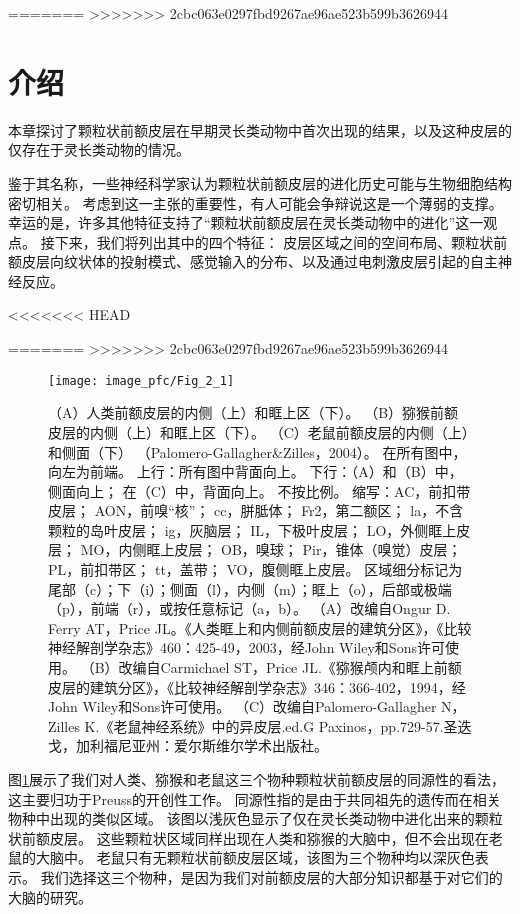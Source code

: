 =======
>>>>>>> 2cbc063e0297fbd9267ae96ae523b599b3626944
\section{介绍}

本章探讨了颗粒状前额皮层在早期灵长类动物中首次出现的结果，以及这种皮层的仅存在于灵长类动物的情况\cite{preuss2007evolutionary}。

鉴于其名称，一些神经科学家认为颗粒状前额皮层的进化历史可能与生物细胞结构密切相关。
考虑到这一主张的重要性，有人可能会争辩说这是一个薄弱的支撑。
幸运的是，许多其他特征支持了“颗粒状前额皮层在灵长类动物中的进化”这一观点。
接下来，我们将列出其中的四个特征：
皮层区域之间的空间布局、颗粒状前额皮层向纹状体的投射模式、感觉输入的分布、以及通过电刺激皮层引起的自主神经反应。




<<<<<<< HEAD


=======
>>>>>>> 2cbc063e0297fbd9267ae96ae523b599b3626944
\begin{figure}[!htb]
	\centering
	\texttt{[image: image\_pfc/Fig\_2\_1]}
	\caption{（A）人类前额皮层的内侧（上）和眶上区（下）\cite{ongur2003architectonic}。 
		（B）猕猴前额皮层的内侧（上）和眶上区（下）\cite{carmichael1994architectonic}。 
		（C）老鼠前额皮层的内侧（上）和侧面（下）
		（Palomero-Gallagher\&Zilles，2004）。
		在所有图中，向左为前端。
		上行：所有图中背面向上。
		下行：（A）和（B）中，侧面向上；
		在（C）中，背面向上。
		不按比例。
		缩写：AC，前扣带皮层；
		AON，前嗅“核”；
		cc，胼胝体；
		Fr2，第二额区；
		la，不含颗粒的岛叶皮层；
		ig，灰脑层；
		IL，下极叶皮层；
		LO，外侧眶上皮层；
		MO，内侧眶上皮层；
		OB，嗅球；
		Pir，锥体（嗅觉）皮层；
		PL，前扣带区；
		tt，盖带；
		VO，腹侧眶上皮层。
		区域细分标记为尾部（c）；下（i）；侧面（l），内侧（m）；眶上（o），后部或极端（p），前端（r），或按任意标记（a，b）。
		（A）改编自Ongur D. Ferry AT，Price JL。《人类眶上和内侧前额皮层的建筑分区》，《比较神经解剖学杂志》460：425-49，2003，经John Wiley和Sons许可使用。 
		（B）改编自Carmichael ST，Price JL.《猕猴颅内和眶上前额皮层的建筑分区》，《比较神经解剖学杂志》346：366-402，1994，经John Wiley和Sons许可使用。 
		（C）改编自Palomero-Gallagher N，Zilles K.《老鼠神经系统》中的异皮层.ed.G Paxinos，pp.729-57.圣迭戈，加利福尼亚州：爱尔斯维尔学术出版社。\label{fig:fig_2_1}}
\end{figure}

图\ref{fig:fig_2_1}展示了我们对人类、猕猴和老鼠这三个物种颗粒状前额皮层的同源性的看法，这主要归功于Preuss\cite{Preuss1991a}的开创性工作。
同源性指的是由于共同祖先的遗传而在相关物种中出现的类似区域。
该图以浅灰色显示了仅在灵长类动物中进化出来的颗粒状前额皮层。
这些颗粒状区域同样出现在人类和猕猴的大脑中，但不会出现在老鼠的大脑中。
老鼠只有无颗粒状前额皮层区域，该图为三个物种均以深灰色表示。
我们选择这三个物种，是因为我们对前额皮层的大部分知识都基于对它们的大脑的研究。


